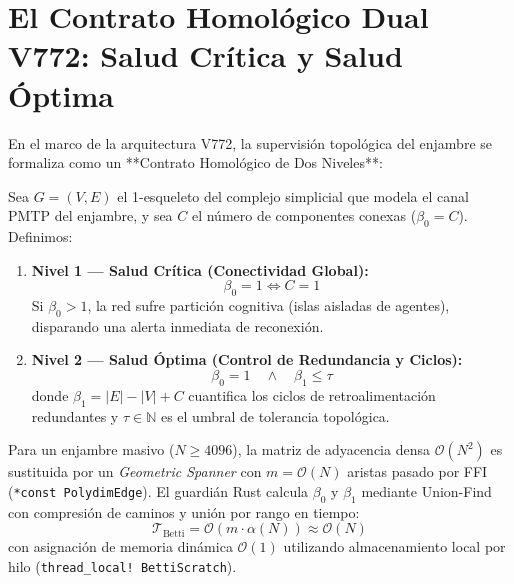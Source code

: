 \section{El Contrato Homológico Dual V772: Salud Crítica y Salud Óptima}


En el marco de la arquitectura V772, la supervisión topológica del enjambre se formaliza como un **Contrato Homológico de Dos Niveles**:

\begin{definition}

Sea $G = (V, E)$ el 1-esqueleto del complejo simplicial que modela el canal PMTP del enjambre, y sea $C$ el número de componentes conexas ($\beta_0 = C$). Definimos:
\begin{enumerate}
    \item \textbf{Nivel 1 — Salud Crítica (Conectividad Global):}
    \begin{equation}
    \beta_0 = 1 \iff C = 1
    \end{equation}
    Si $\beta_0 > 1$, la red sufre partición cognitiva (islas aisladas de agentes), disparando una alerta inmediata de reconexión.
    
    \item \textbf{Nivel 2 — Salud Óptima (Control de Redundancia y Ciclos):}
    \begin{equation}
    \beta_0 = 1 \quad \land \quad \beta_1 \le \tau
    \end{equation}
    donde $\beta_1 = |E| - |V| + C$ cuantifica los ciclos de retroalimentación redundantes y $\tau \in \mathbb{N}$ es el umbral de tolerancia topológica.
\end{enumerate}
\end{definition}

\begin{theorem}

Para un enjambre masivo ($N \ge 4096$), la matriz de adyacencia densa $\mathcal{O}(N^2)$ es sustituida por un \emph{Geometric Spanner} con $m = \mathcal{O}(N)$ aristas pasado por FFI (\texttt{*const PolydimEdge}). El guardián Rust calcula $\beta_0$ y $\beta_1$ mediante Union-Find con compresión de caminos y unión por rango en tiempo:
\begin{equation}
\mathcal{T}_{\text{Betti}} = \mathcal{O}(m \cdot \alpha(N)) \approx \mathcal{O}(N)
\end{equation}
con asignación de memoria dinámica $\mathcal{O}(1)$ utilizando almacenamiento local por hilo (\texttt{thread\_local! BettiScratch}).
\end{theorem}

